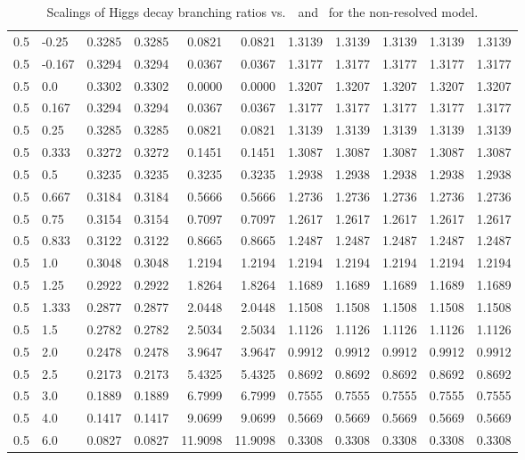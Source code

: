 \begin{table}[h!]
\begin{tabular}{ll rrrrrrrrr}
   0.5  & -0.25  & 0.3285 & 0.3285 & 0.0821  & 0.0821  & 1.3139 & 1.3139 & 1.3139 & 1.3139 & 1.3139 \\
   0.5  & -0.167 & 0.3294 & 0.3294 & 0.0367  & 0.0367  & 1.3177 & 1.3177 & 1.3177 & 1.3177 & 1.3177 \\
   0.5  & 0.0    & 0.3302 & 0.3302 & 0.0000  & 0.0000  & 1.3207 & 1.3207 & 1.3207 & 1.3207 & 1.3207 \\
   0.5  & 0.167  & 0.3294 & 0.3294 & 0.0367  & 0.0367  & 1.3177 & 1.3177 & 1.3177 & 1.3177 & 1.3177 \\
   0.5  & 0.25   & 0.3285 & 0.3285 & 0.0821  & 0.0821  & 1.3139 & 1.3139 & 1.3139 & 1.3139 & 1.3139 \\
   0.5  & 0.333  & 0.3272 & 0.3272 & 0.1451  & 0.1451  & 1.3087 & 1.3087 & 1.3087 & 1.3087 & 1.3087 \\
   0.5  & 0.5    & 0.3235 & 0.3235 & 0.3235  & 0.3235  & 1.2938 & 1.2938 & 1.2938 & 1.2938 & 1.2938 \\
   0.5  & 0.667  & 0.3184 & 0.3184 & 0.5666  & 0.5666  & 1.2736 & 1.2736 & 1.2736 & 1.2736 & 1.2736 \\
   0.5  & 0.75   & 0.3154 & 0.3154 & 0.7097  & 0.7097  & 1.2617 & 1.2617 & 1.2617 & 1.2617 & 1.2617 \\
   0.5  & 0.833  & 0.3122 & 0.3122 & 0.8665  & 0.8665  & 1.2487 & 1.2487 & 1.2487 & 1.2487 & 1.2487 \\
   0.5  & 1.0    & 0.3048 & 0.3048 & 1.2194  & 1.2194  & 1.2194 & 1.2194 & 1.2194 & 1.2194 & 1.2194 \\
   0.5  & 1.25   & 0.2922 & 0.2922 & 1.8264  & 1.8264  & 1.1689 & 1.1689 & 1.1689 & 1.1689 & 1.1689 \\
   0.5  & 1.333  & 0.2877 & 0.2877 & 2.0448  & 2.0448  & 1.1508 & 1.1508 & 1.1508 & 1.1508 & 1.1508 \\
   0.5  & 1.5    & 0.2782 & 0.2782 & 2.5034  & 2.5034  & 1.1126 & 1.1126 & 1.1126 & 1.1126 & 1.1126 \\
   0.5  & 2.0    & 0.2478 & 0.2478 & 3.9647  & 3.9647  & 0.9912 & 0.9912 & 0.9912 & 0.9912 & 0.9912 \\
   0.5  & 2.5    & 0.2173 & 0.2173 & 5.4325  & 5.4325  & 0.8692 & 0.8692 & 0.8692 & 0.8692 & 0.8692 \\
   0.5  & 3.0    & 0.1889 & 0.1889 & 6.7999  & 6.7999  & 0.7555 & 0.7555 & 0.7555 & 0.7555 & 0.7555 \\
   0.5  & 4.0    & 0.1417 & 0.1417 & 9.0699  & 9.0699  & 0.5669 & 0.5669 & 0.5669 & 0.5669 & 0.5669 \\
   0.5  & 6.0    & 0.0827 & 0.0827 & 11.9098 & 11.9098 & 0.3308 & 0.3308 & 0.3308 & 0.3308 & 0.3308 \\\hline
    \end{tabular}
    \caption[Scalings of Higgs decay branching ratios vs.\ \Ct\ and \ ]{Scalings of Higgs decay branching ratios vs.\ \Ct\ and \ for the non-resolved model.}\label{tab:brscalingK6_0p5}
 \end{table}

